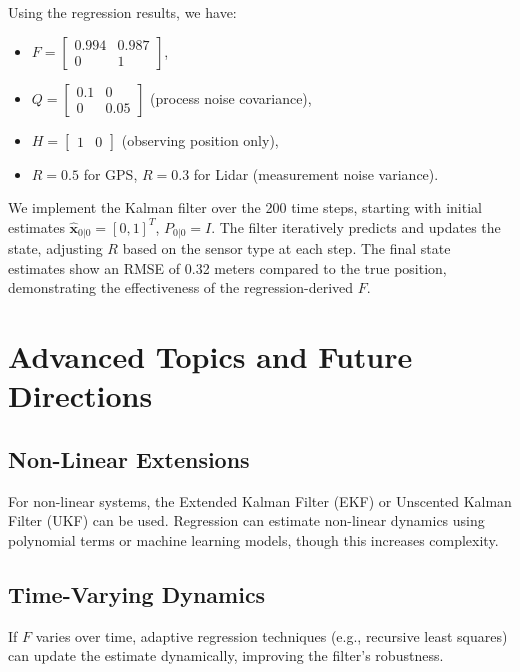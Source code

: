 \documentclass[12pt]{article}
\begin{document}
Using the regression results, we have:
\begin{itemize}
    \item \( F = \begin{bmatrix} 0.994 & 0.987 \\ 0 & 1 \end{bmatrix} \),
    \item \( Q = \begin{bmatrix} 0.1 & 0 \\ 0 & 0.05 \end{bmatrix} \) (process noise covariance),
    \item \( H = \begin{bmatrix} 1 & 0 \end{bmatrix} \) (observing position only),
    \item \( R = 0.5 \) for GPS, \( R = 0.3 \) for Lidar (measurement noise variance).
\end{itemize}

We implement the Kalman filter over the 200 time steps, starting with initial estimates \( \hat{\mathbf{x}}_{0|0} = [0, 1]^T \), \( P_{0|0} = I \). The filter iteratively predicts and updates the state, adjusting \( R \) based on the sensor type at each step. The final state estimates show an RMSE of 0.32 meters compared to the true position, demonstrating the effectiveness of the regression-derived \( F \).

\section{Advanced Topics and Future Directions}
\label{sec:future}

\subsection{Non-Linear Extensions}
For non-linear systems, the Extended Kalman Filter (EKF) or Unscented Kalman Filter (UKF) can be used. Regression can estimate non-linear dynamics using polynomial terms or machine learning models, though this increases complexity.

\subsection{Time-Varying Dynamics}
If \( F \) varies over time, adaptive regression techniques (e.g., recursive least squares) can update the estimate dynamically, improving the filter’s robustness.
\end{document}
